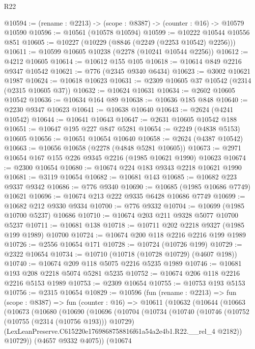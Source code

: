 \begin{lexlean}{R22}
\begin{coremodule}
@10594 := (rename : @2213) -> (scope : @8387) -> (counter : @16) -> @10579 @10590
@10596 := @10561 (@10578 @10594)
@10599 := @10222 @10544 @10556 @851
@10605 := @10227 (@10229 (@8846 (@2249 (@2253 @10542) @2256)))
@10611 := @10599 @10605 @10238 (@2278 (@10241 @10544 @2256))
@10612 := @4212 @10605
@10614 := @10612 @155 @105
@10618 := @10614 @849 @2216 @9347 @10542
@10621 := @776 (@2345 @9340 @6434)
@10623 := @3002 @10621 @1987
@10624 := @10618 @10623
@10631 := @2309 @10605 @37 @10542 (@2314 (@2315 @10605 @37))
@10632 := @10624 @10631
@10634 := @2602 @10605 @10542
@10636 := @10634 @164 @89
@10638 := @10636 @185 @848
@10640 := @2230 @9347 @10623
@10641 := @10638 @10640
@10643 := @2624 (@4241 @10542)
@10644 := @10641 @10643
@10647 := @2631 @10605 @10542 @188
@10651 := @10647 @195 @227 @847 @5281
@10654 := @2249 (@4838 @5153) @10605
@10656 := @10651 @10654 @10640
@10658 := @2624 (@4387 @10542)
@10663 := @10656 @10658 (@2278 (@4848 @5281 @10605))
@10673 := @2971 @10654 @167 @155 @226 @9345 @2216 (@1985 @10621 @1990) @10623
@10674 := @2300 @10654
@10680 := @10674 @224 @183 @9343 @2218 @10621 @1990
@10681 := @3119 @10654
@10682 := @10681 @143
@10685 := @10682 @223 @9337 @9342
@10686 := @776 @9340
@10690 := @10685 (@1985 @10686 @7749) @10621
@10696 := @10674 @213 @222 @9335 @6428 @10686 @7749
@10699 := @10682 @212 @9330 @9334
@10700 := @776 @9332
@10704 := @10699 (@1985 @10700 @5237) @10686
@10710 := @10674 @203 @211 @9328 @5077 @10700 @5237
@10711 := @10681 @138
@10718 := @10711 @202 @2218 @9327 (@1985 @199 @1989) @10700
@10724 := @10674 @200 @118 @2216 @2216 @199 @1989
@10726 := @2556 @10654 @171
@10728 := @10724 (@10726 @199)
@10729 := @2322 @10654
@10734 := @10710 (@10718 (@10728 @10729) (@4607 @198))
@10740 := @10674 @209 @118 @5075 @2216 @5235 @1989
@10746 := @10681 @193 @208 @2218 @5074 @5281 @5235
@10752 := @10674 @206 @118 @2216 @2216 @5153 @1989
@10753 := @2309 @10654
@10755 := @10753 @193 @5153
@10756 := @2315 @10654
@10829 := @10596
    (fun (rename : @2213) =>
    fun (scope : @8387) =>
    fun (counter : @16) =>
    @10611
      (@10632
        (@10644
          (@10663
            (@10673
              (@10680
                (@10690
                  (@10696
                    (@10704
                      (@10734
                        (@10740
                          (@10746
                            (@10752 (@10755 (@2314 (@10756 @193))) @10729)
                            (LexLeanPreserve.C615220e1769868758816f61a54a2e4b1.R22.__rel_4 @2182))
                          @10729))
                      (@4657 @9332 @4075))
                    (@10674

\end{coremodule}
\end{lexlean}
